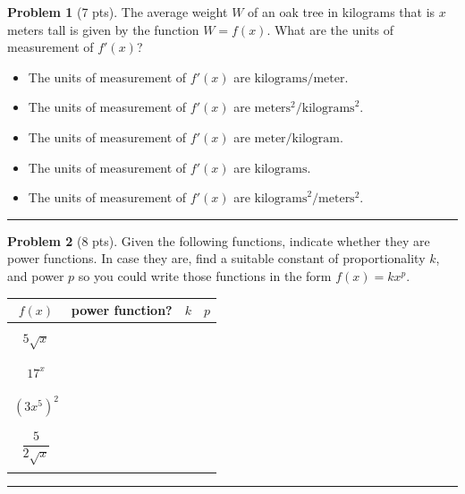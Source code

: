 \documentclass[12pt]{article}
\makeatletter
\theoremstyle{definition}
\newtheorem{problem}{Problem}
\newcommand*{\radiobutton}{%
  \@ifstar{\@radiobutton0}{\@radiobutton1}%
}
\newcommand*{\@radiobutton}[1]{%
  \begin{tikzpicture}
    \pgfmathsetlengthmacro\radius{height("X")/2}
    \draw[radius=\radius] circle;
    \ifcase#1 \fill[radius=.6*\radius] circle;\fi
  \end{tikzpicture}%
}
\makeatother
\begin{document}
\bigskip
\begin{problem}[7 pts]
The average weight $W$ of an oak tree in kilograms that is $x$ meters tall is given by the function $W=f(x)$.
What are the units of measurement of $f'(x)$?
\begin{itemize}
\item[\radiobutton] The units of measurement of $f'(x)$ are $\text{kilograms}/\text{meter}$.
\item[\radiobutton] The units of measurement of $f'(x)$ are $\text{meters}^2/\text{kilograms}^2$.
\item[\radiobutton] The units of measurement of $f'(x)$ are $\text{meter}/\text{kilogram}$.
\item[\radiobutton] The units of measurement of $f'(x)$ are $\text{kilograms}$.
\item[\radiobutton] The units of measurement of $f'(x)$ are $\text{kilograms}^2/\text{meters}^2$.
\end{itemize}
\end{problem}
\hrule

\begin{problem}[8 pts]
Given the following functions, indicate whether they are power functions. In case they are, find a suitable constant of proportionality $k$, and power $p$ so you could write those functions in the form $f(x) = kx^p$.
\begin{center}
\begin{tabular}{|c|c|c|c|}
\hline
$f(x)$ & power function? & $k$ & $p$ \\
\hline
\hline
&&& \\
$5\sqrt{x}$ &&\hspace{1cm} & \hspace{1cm} \\
&&& \\
\hline
&&& \\
$17^x$ &&& \\
&&& \\
\hline
&&& \\
$(3x^5)^2$ &&& \\
&&& \\
\hline
&&& \\
$\dfrac{5}{2\sqrt{x}}$ &&& \\
&&& \\
\hline
\end{tabular}
\end{center}
\end{problem}
\hrule
\end{document}
